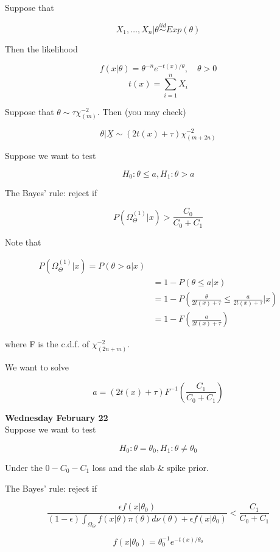 \documentclass[11pt,fleqn]{book} %
\begin{document}
\begin{example}
	Suppose that 

			$$X_1, \dots, X_n | \theta \stackrel{iid}{\sim} Exp(\theta) $$

	Then the likelihood 

			$$f(x|\theta) = \theta^{-n} e^{- t(x)/ \theta}, \quad \theta > 0 $$
			$$t(x) = \sum^n_{i=1} X_i $$

	Suppose that $\theta \sim \tau \chi^{-2}_{(m)}$. Then (you may check) 

			$$\theta| \underline{X} \sim (2 t(x) + \tau) \chi^{-2}_{(m+2n)} $$


	Suppose we want to test 

			$$H_0: \theta \leq a, H_1: \theta > a $$

	The Bayes' rule: reject if

			$$P(\Omega_\Theta^{(1)}|x) > \frac{C_0}{C_0 + C_1} $$


	Note that 

			\begin{align*}
			 	P(\Omega_\Theta^{(1)}|x) = P(\theta > a| x)\\
			 		&=1 - P(\theta \leq a| x)\\
			 		&= 1 - P\left(\frac{\theta}{2 t(x) + \tau} \leq \frac{a}{2 t(x) + \tau} |x\right)\\
			 		&= 1 - F(\frac{a}{2 t(x) +\tau})
			 \end{align*} 

where F is the c.d.f. of $\chi^{-2}_{(2n+m)}$. 

We want to solve

		$$a = (2t(x) + \tau) F^{-1}(\frac{C_1}{C_0 + C_1}) $$


\end{example}



\textbf{Wednesday February 22}\\


Suppose we want to test 

			$$H_0: \theta =\theta_0, H_1: \theta \neq \theta_0 $$

Under the $0-C_0-C_1$ loss and the slab \& spike prior. 

	The Bayes' rule: reject if

			$$\frac{\epsilon f(x|\theta_0)}{(1-\epsilon) \int_{\Omega_\Theta} f(x| \theta) \pi(\theta) d \nu(\theta) + \epsilon f(x|\theta_0) } < \frac{C_1}{C_0 + C_1} $$

			$$f(x|\theta_0) = \theta_0^{-1}e^{-t(x)/\theta_0} $$
\end{document}
